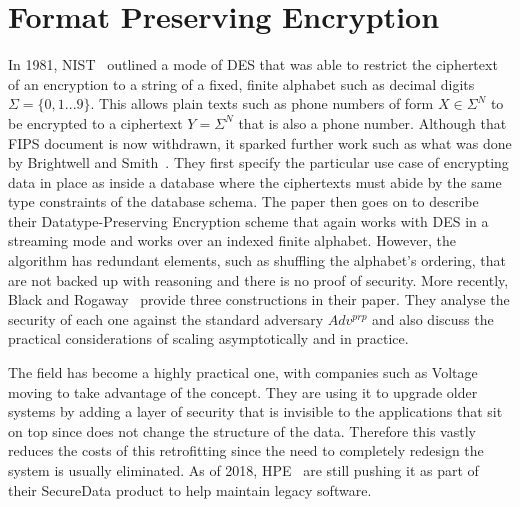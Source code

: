 \documentclass[ %
                    author={Samuel Russell},
                supervisor={Prof. Bogdan Warinschi},
                    degree={MEng},
                     title={Innocuous Ciphertexts},
                  subtitle={The DE-CENSOR Scheme},
                      type={Research},
                      year={2018} ]{dissertation}
\begin{document}
\section{Format Preserving Encryption}

In 1981, NIST~\cite{FIPS74} outlined a mode of DES that was able to restrict the ciphertext of an encryption to a string of a fixed, finite alphabet such as decimal digits $ \Sigma = \{0,1...9\} $. This allows plain texts such as phone numbers of form $ X \in \Sigma^N $ to be encrypted to a ciphertext $ Y = \Sigma^N $ that is also a phone number. Although that FIPS document is now withdrawn, it sparked further work such as what was done by Brightwell and Smith~\cite{DPE}. They first specify the particular use case of encrypting data in place as inside a database where the ciphertexts must abide by the same type constraints of the database schema. The paper then goes on to describe their  Datatype-Preserving Encryption scheme that again works with DES in a streaming mode and works over an indexed finite alphabet. However, the algorithm has redundant elements, such as shuffling the alphabet's ordering, that are not backed up with reasoning and there is no proof of security. More recently, Black and Rogaway~\cite{CAFD} provide three constructions in their paper. They analyse the security of each one against the standard adversary $Adv^{prp}$ and also discuss the practical considerations of scaling asymptotically and in practice.

The field has become a highly practical one, with companies such as Voltage moving to take advantage of the concept. They are using it to upgrade older systems by adding a layer of security that is invisible to the applications that sit on top since does not change the structure of the data. Therefore this vastly reduces the costs of this retrofitting since the need to completely redesign the system is usually eliminated. As of 2018, HPE~\cite{hp} are still pushing it as part of their SecureData product to help maintain legacy software.
\end{document}
